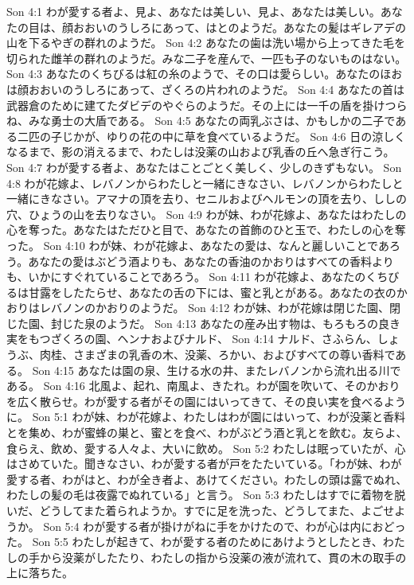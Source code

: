 Son 4:1  わが愛する者よ、見よ、あなたは美しい、見よ、あなたは美しい。あなたの目は、顔おおいのうしろにあって、はとのようだ。あなたの髪はギレアデの山を下るやぎの群れのようだ。
Son 4:2  あなたの歯は洗い場から上ってきた毛を切られた雌羊の群れのようだ。みな二子を産んで、一匹も子のないものはない。
Son 4:3  あなたのくちびるは紅の糸のようで、その口は愛らしい。あなたのほおは顔おおいのうしろにあって、ざくろの片われのようだ。
Son 4:4  あなたの首は武器倉のために建てたダビデのやぐらのようだ。その上には一千の盾を掛けつらね、みな勇士の大盾である。
Son 4:5  あなたの両乳ぶさは、かもしかの二子である二匹の子じかが、ゆりの花の中に草を食べているようだ。
Son 4:6  日の涼しくなるまで、影の消えるまで、わたしは没薬の山および乳香の丘へ急ぎ行こう。
Son 4:7  わが愛する者よ、あなたはことごとく美しく、少しのきずもない。
Son 4:8  わが花嫁よ、レバノンからわたしと一緒にきなさい、レバノンからわたしと一緒にきなさい。アマナの頂を去り、セニルおよびヘルモンの頂を去り、ししの穴、ひょうの山を去りなさい。
Son 4:9  わが妹、わが花嫁よ、あなたはわたしの心を奪った。あなたはただひと目で、あなたの首飾のひと玉で、わたしの心を奪った。
Son 4:10  わが妹、わが花嫁よ、あなたの愛は、なんと麗しいことであろう。あなたの愛はぶどう酒よりも、あなたの香油のかおりはすべての香料よりも、いかにすぐれていることであろう。
Son 4:11  わが花嫁よ、あなたのくちびるは甘露をしたたらせ、あなたの舌の下には、蜜と乳とがある。あなたの衣のかおりはレバノンのかおりのようだ。
Son 4:12  わが妹、わが花嫁は閉じた園、閉じた園、封じた泉のようだ。
Son 4:13  あなたの産み出す物は、もろもろの良き実をもつざくろの園、ヘンナおよびナルド、
Son 4:14  ナルド、さふらん、しょうぶ、肉桂、さまざまの乳香の木、没薬、ろかい、およびすべての尊い香料である。
Son 4:15  あなたは園の泉、生ける水の井、またレバノンから流れ出る川である。
Son 4:16  北風よ、起れ、南風よ、きたれ。わが園を吹いて、そのかおりを広く散らせ。わが愛する者がその園にはいってきて、その良い実を食べるように。
Son 5:1  わが妹、わが花嫁よ、わたしはわが園にはいって、わが没薬と香料とを集め、わが蜜蜂の巣と、蜜とを食べ、わがぶどう酒と乳とを飲む。友らよ、食らえ、飲め、愛する人々よ、大いに飲め。
Son 5:2  わたしは眠っていたが、心はさめていた。聞きなさい、わが愛する者が戸をたたいている。「わが妹、わが愛する者、わがはと、わが全き者よ、あけてください。わたしの頭は露でぬれ、わたしの髪の毛は夜露でぬれている」と言う。
Son 5:3  わたしはすでに着物を脱いだ、どうしてまた着られようか。すでに足を洗った、どうしてまた、よごせようか。
Son 5:4  わが愛する者が掛けがねに手をかけたので、わが心は内におどった。
Son 5:5  わたしが起きて、わが愛する者のためにあけようとしたとき、わたしの手から没薬がしたたり、わたしの指から没薬の液が流れて、貫の木の取手の上に落ちた。
